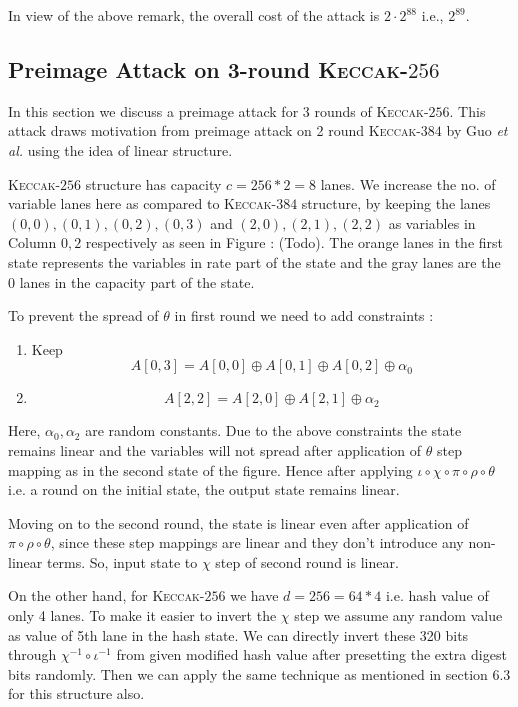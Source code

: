 \documentclass[runningheads]{llncs}
\newcommand{\KECCAK}{\mbox{\textsc{Keccak}}}
\newcommand{\Keccak}{\mbox{\textsc{Keccak}}}
\newcommand{\etal}{\textit{et al. }}
\begin{document}
In view of the above remark, the overall cost of the attack is $2\cdot 2^{88}$ i.e., $2^{89}$.

\subsection{Preimage Attack on 3-round \Keccak-$256$}
In this section we discuss a preimage attack for 3 rounds of \KECCAK-$256$. This attack draws motivation from preimage attack on 2 round \Keccak-$384$ by Guo \etal using the idea of linear structure. 

\Keccak-$256$ structure has capacity $c = 256*2 = 8$ lanes. We increase the no. of variable lanes here as compared to \Keccak-$384$ structure, by keeping the lanes $(0,0), (0,1), (0,2), (0,3)$ and $(2,0), (2,1), (2,2)$ as variables in Column $0, 2$ respectively as seen in Figure : (Todo). The orange lanes in the first state represents the variables in rate part of the state and the gray lanes are the $0$ lanes in the capacity part of the state.

To prevent the spread of $\theta$ in first round we need to add constraints :
\begin{enumerate}
\item Keep \[
        A[0,3] = A[0,0] \oplus A[0,1] \oplus A[0, 2] \oplus \alpha_0
    \]
\item \[
        A[2,2] = A[2,0] \oplus A[2,1] \oplus \alpha_2
    \]
\end{enumerate}
Here, $\alpha_0, \alpha_2$ are random constants.
Due to the above constraints the state remains linear and the variables will not spread after application of $\theta$ step mapping as in the second state of the figure. Hence after applying $\iota \circ \chi \circ \pi \circ \rho \circ \theta $ i.e. a round on the initial state, the output state remains linear.

Moving on to the second round, the state is linear even after application of $\pi \circ \rho \circ \theta$, since these step mappings are linear and they don't introduce any non-linear terms. So, input state to $\chi$ step of second round is linear.

On the other hand, for \KECCAK-$256$ we have $d = 256 = 64*4$ i.e. hash value of only 4 lanes. To make it easier to invert the $\chi$ step we assume any random value as value of 5th lane in the hash state.
We can directly invert these 320 bits through $\chi^{-1} \circ \iota^{-1}$ from given modified hash value after presetting the extra digest bits randomly.
Then we can apply the same technique as mentioned in section 6.3 \cite{guo2016linear} for this structure also. 
\end{document}
